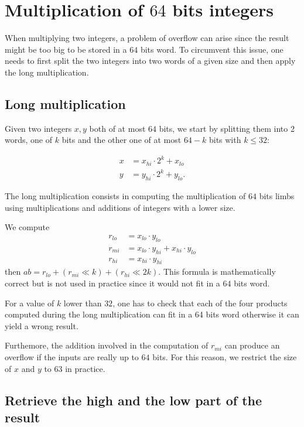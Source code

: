 \documentclass[a4paper]{article}
\begin{document}
\section{Multiplication of $64$ bits integers}

When multiplying two integers, a problem of overflow can arise since the result might be too big to be stored in a $64$ bits word. 
To circumvent this issue, one needs to first split the two integers into two words of a given size and then apply the long multiplication.

\subsection{Long multiplication}
Given two integers $x,y$ both of at most $64$ bits, we start by splitting them into 2 words, one of $k$ bits and the other one of at most $64-k$
bits with $k\leq32$:

\begin{align*}
    x &= x_{hi}\cdot 2^{k} + x_{lo} \\
    y &= y_{hi}\cdot 2^{k} + y_{lo}.
\end{align*}

The long multiplication consists in computing the multiplication of $64$ bits limbs using multiplications and additions of
integers with a lower size.

We compute
\begin{align*}
    r_{lo} &= x_{lo}\cdot y_{lo} \\
    r_{mi} &= x_{lo}\cdot y_{hi} + x_{hi}\cdot y_{lo} \\
    r_{hi} &= x_{hi}\cdot y_{hi}
\end{align*}
then $ab = r_{lo} + (r_{mi} \ll k) + (r_{hi} \ll 2k)$. This formula is mathematically correct but is not used in practice
since it would not fit in a $64$ bits word. 

For a value of $k$ lower than $32$, one has to check that each of the four products computed during the long multiplication can fit in a
64 bits word otherwise it can yield a wrong result.

Furthemore, the addition involved in the computation of $r_{mi}$ can produce an overflow if the inputs are really up to $64$ bits.
For this reason, we restrict the size of $x$ and $y$ to $63$ in practice. 

\subsection{Retrieve the high and the low part of the result}
\end{document}
